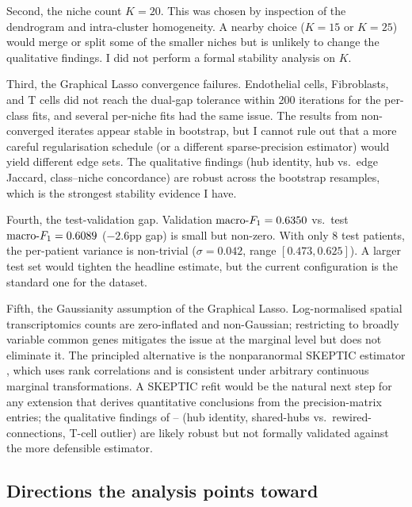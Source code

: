Second, the niche count $K = 20$. This was chosen by inspection of the dendrogram and intra-cluster homogeneity. A nearby choice ($K = 15$ or $K = 25$) would merge or split some of the smaller niches but is unlikely to change the qualitative findings. I did not perform a formal stability analysis on $K$.

Third, the Graphical Lasso convergence failures. Endothelial cells, Fibroblasts, and T cells did not reach the dual-gap tolerance within 200 iterations for the per-class fits, and several per-niche fits had the same issue. The results from non-converged iterates appear stable in bootstrap, but I cannot rule out that a more careful regularisation schedule (or a different sparse-precision estimator) would yield different edge sets. The qualitative findings (hub identity, hub vs.\ edge Jaccard, class--niche concordance) are robust across the bootstrap resamples, which is the strongest stability evidence I have.

Fourth, the test-validation gap. Validation $\text{macro-}F_{1} = 0.6350$ vs.\ test $\text{macro-}F_{1} = 0.6089$ ($-2.6$pp gap) is small but non-zero. With only 8 test patients, the per-patient variance is non-trivial ($\sigma = 0.042$, range $[0.473, 0.625]$). A larger test set would tighten the headline estimate, but the current configuration is the standard one for the dataset.

Fifth, the Gaussianity assumption of the Graphical Lasso. Log-normalised spatial transcriptomics counts are zero-inflated and non-Gaussian; restricting to broadly variable common genes mitigates the issue at the marginal level but does not eliminate it. The principled alternative is the nonparanormal SKEPTIC estimator \cite{liu2012nonparanormal}, which uses rank correlations and is consistent under arbitrary continuous marginal transformations. A SKEPTIC refit would be the natural next step for any extension that derives quantitative conclusions from the precision-matrix entries; the qualitative findings of -- (hub identity, shared-hubs vs.\ rewired-connections, T-cell outlier) are likely robust but not formally validated against the more defensible estimator.

\subsection*{Directions the analysis points toward}

